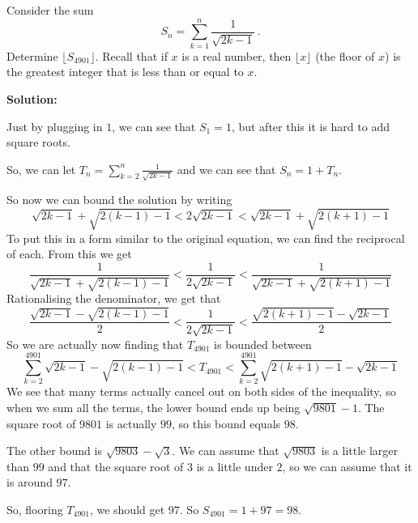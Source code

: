 \documentclass[../mathproblems.tex]{subfiles}
\begin{document}
Consider the sum
\[ S_n = \sum_{k = 1}^n \frac{1}{\sqrt{2k-1}} \, . \]Determine $\lfloor S_{4901} \rfloor$. Recall that if $x$ is a real number, then $\lfloor x \rfloor$ (the floor of $x$) is the greatest integer that is less than or equal to $x$.

\textbf{Solution:}

Just by plugging in $1$, we can see that $S_1 = 1$, but after this it is hard to add square roots.

So, we can let $T_n = \sum_{k=2}^n \frac{1}{\sqrt{2k-1}}$ and we can see that $S_n = 1+T_n$.

So now we can bound the solution by writing
\[ \sqrt{2k-1} + \sqrt{2(k-1)-1} < 2\sqrt{2k-1} < \sqrt{2k-1}+\sqrt{2(k+1)-1} \]
To put this in a form similar to the original equation, we can find the reciprocal of each. From this we get
\[ \frac{1}{\sqrt{2k-1}+\sqrt{2(k-1)-1}} < \frac{1}{2\sqrt{2k-1}} < \frac{1}{\sqrt{2k-1}+\sqrt{2(k+1)-1}} \]
Rationalising the denominator, we get that
\[ \frac{\sqrt{2k-1}-\sqrt{2(k-1)-1}}{2} < \frac{1}{2\sqrt{2k-1}} < \frac{\sqrt{2(k+1)-1}-\sqrt{2k-1}}{2} \]
So we are actually now finding that $T_{4901}$ is bounded between
\[ \sum_{k=2}^{4901} \sqrt{2k-1}-\sqrt{2(k-1)-1} < T_{4901} < \sum_{k=2}^{4901} \sqrt{2(k+1)-1}-\sqrt{2k-1} \]
We see that many terms actually cancel out on both sides of the inequality, so when we sum all the terms, the lower bound ends up being $\sqrt{9801}-1$. The square root of $9801$ is actually $99$, so this bound equals $98$.

The other bound is $\sqrt{9803}-\sqrt{3}$. We can assume that $\sqrt{9803}$ is a little larger than $99$ and that the square root of $3$ is a little under $2$, so we can assume that it is around $97$.

So, flooring $T_{4901}$, we should get $97$. So $S_{4901} = 1 + 97 = \boxed{98}$.

\noindent\hrulefill
\end{document}
